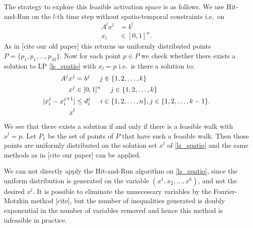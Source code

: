 The strategy to explore this feasible activation space is as follows. We use Hit-and-Run on the $l$-th time step without spatio-temporal constraints i.e.\ on 
\begin{align}
A^l x^l &= b^l \nonumber \\
x_l &\in [0,1]^n. \nonumber
\end{align}
As in [cite our old paper] this returns us uniformly distributed points $P = \{p_1,p_1,\dots, p_M\}$. Now for each point $p \in P$ we check whether there exists a solution to LP \ref{ls_spatio} with $x_l = p$ i.e.\ is there a solution to: 
\begin{align}
A^jx^j &= b^j \hspace{5mm} j \in \{1,2,\dots, k\}  \nonumber \\
x^j &\in [0,1]^n \hspace{5mm}  j \in \{1,2,\dots, k\} \nonumber \\
|x_i^j - x_i^{j+1}| &\leq d_i^j \hspace{5mm} i \in \{1,2,\dots,n\}, j \in \{1,2,\dots, k-1\}.  \nonumber \\%
x^l %
\end{align}
We see that there exists a solution if and only if there is a feasible walk with $x^l = p$. Let $P_1$ be the set of points of $P$ that have such a feasible walk. Then those points are uniformly distributed on the solution set $x^l$ of \ref{ls_spatio} and the same methods as in [cite our paper] can be applied.

We can not directly apply the Hit-and-Run algorithm on \ref{ls_spatio}, since the uniform distribution is generated on the variable $(x^1,x_2,\dots,x^k)$, and not the desired $x^l$. It is possible to eliminate the unnecessary variables by the Fourier-Motzkin method [cite], but the number of inequalities generated is doubly exponential in the number of variables removed and hence this method is infeasible in practice.